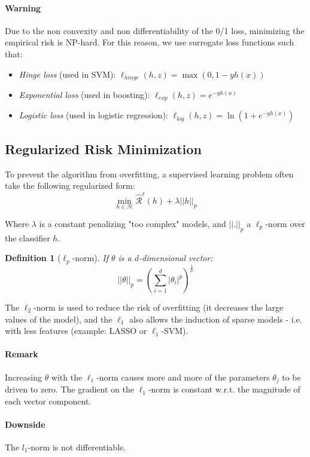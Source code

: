 \documentclass{article}
\newtheorem{defi}{Definition}
\begin{document}
\paragraph{Warning}
Due to the non convexity and non differentiability of the 0/1 loss, minimizing the empirical risk is NP-hard. For this reason, we use surrogate loss functions such that:
\begin{itemize}
\item \emph{Hinge loss} (used in SVM): $\ell_{hinge}(h,z) = \max (0,1-yh(x))$
\item \emph{Exponential loss} (used in boosting): $\ell_{exp}(h,z)=e^{-yh(x)}$
\item \emph{Logistic loss} (used in logistic regression): $\ell_{log}(h,z)=\ln (1+e^{-yh(x)})$
\end{itemize}

\subsection{Regularized Risk Minimization}
To prevent the algorithm from overfitting, a supervised learning problem often take the following regularized form:
\[\min_{h\in \mathcal{H}} \hat{\mathcal{R}}^\ell (h) + \lambda ||h||_p\]

Where $\lambda$ is a constant penalizing "too complex" models, and $||.||_p$ a $\ell_p$-norm over the classifier $h$.

\begin{defi}[$\ell_p$-norm]
If $\theta$ is a $d$-dimensional vector:
\[||\theta||_p = \left( \sum_{i=1}^d |\theta_i |^p \right)^{\frac{1}{p}}\]
\end{defi}

The $\ell_2$-norm is used to reduce the risk of overfitting (it decreases the large values of the model), and the $\ell_1$ also allows the induction of sparse models - i.e. with less features (example: LASSO or $\ell_1$-SVM).

\paragraph{Remark}
Increasing $\theta$ with the $\ell_1$-norm causes more and more of the parameters $\theta_j$ to be driven to zero. The gradient on the $\ell_1$-norm is constant w.r.t. the magnitude of each vector component.

\paragraph{Downside}
The $l_1$-norm is not differentiable.
\bigskip
\end{document}
